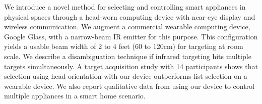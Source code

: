 We introduce a novel method for selecting and controlling smart appliances in physical spaces through a head-worn computing device with near-eye display and wireless communication. We augment a commercial wearable computing device, Google Glass, with a narrow-beam IR emitter for this purpose. This configuration yields a usable beam width of 2 to 4 feet (60 to 120cm) for targeting at room scale. We describe a disambiguation technique if infrared targeting hits multiple targets simultaneously. A target acquisition study with 14 participants shows that selection using head orientation with our device outperforms list selection on a wearable device. We also report qualitative data from using our device to control multiple appliances in a smart home scenario.